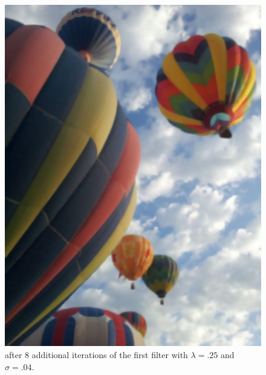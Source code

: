\begin{figure}[ht]
\begin{minipage}[b]{0.45\linewidth}
\includegraphics[width=\textwidth]{baloons_resized_both.jpg}
\caption*{after 8 additional iterations of the first filter with $\lambda=.25$ and $\sigma=.04$.}
\end{minipage}
\end{figure}
\vfill
\clearpage

\nocite{Perona1988,Kim2009}
\printbibliography 